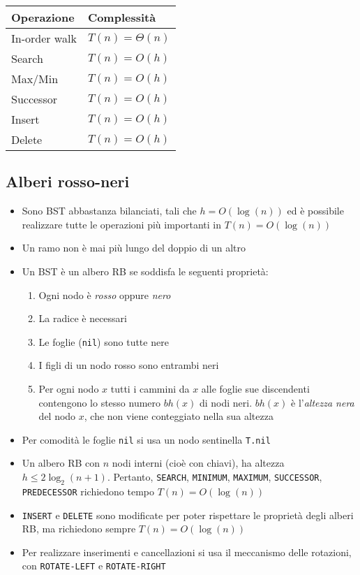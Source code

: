 \documentclass[10pt,a4paper]{article}
\newcommand{\code}{\texttt}
\begin{document}
\begin{multicols*}{2}
\begin{tabular}{l l}
    Operazione & Complessità\\
    \hline
    In-order walk & $T(n) = \varTheta(n)$ \\
    Search & $T(n) = O(h)$ \\
    Max/Min & $T(n) = O(h) $\\
    Successor & $T(n) = O(h) $\\
    Insert & $T(n) = O(h) $\\
    Delete & $T(n) = O(h) $\\
\end{tabular}
\subsection*{Alberi rosso-neri}
\begin{itemize}
    \item Sono BST abbastanza bilanciati, tali che $h = O(\log(n))$ ed è possibile realizzare tutte le operazioni più importanti in $T(n) = O(\log(n))$
    \item Un ramo non è mai più lungo del doppio di un altro
    \item Un BST è un albero RB se soddisfa le seguenti proprietà:
    \begin{enumerate}
        \item Ogni nodo è \emph{rosso} oppure \emph{nero}
        \item La radice è necessari
        \item Le foglie (\code{nil}) sono tutte nere
        \item I figli di un nodo rosso sono entrambi neri
        \item Per ogni nodo $x$ tutti i cammini da $x$ alle foglie sue discendenti contengono lo stesso numero $bh(x)$ di nodi neri. $bh(x)$ è l'\emph{altezza nera} del nodo $x$, che non viene conteggiato nella sua altezza
    \end{enumerate}
    \item Per comodità le foglie \code{nil} si usa un nodo sentinella \code{T.nil}
    \item Un albero RB con $n$ nodi interni (cioè con chiavi), ha altezza $h \le 2\log_2(n+1)$. Pertanto, \code{SEARCH}, \code{MINIMUM}, \code{MAXIMUM}, \code{SUCCESSOR}, \code{PREDECESSOR} richiedono tempo $T(n) = O(\log(n))$
    \item \code{INSERT} e \code{DELETE} sono modificate per poter rispettare le proprietà degli alberi RB, ma richiedono sempre $T(n) = O(\log(n))$
    \item Per realizzare inserimenti e cancellazioni si usa il meccanismo delle rotazioni, con \code{ROTATE-LEFT} e \code{ROTATE-RIGHT}
\end{itemize}

\end{multicols*}
\end{document}

